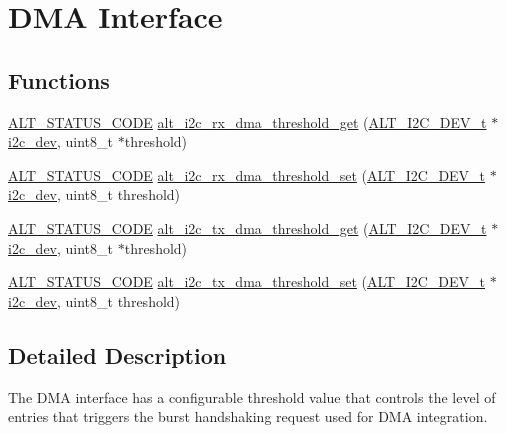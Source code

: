 \hypertarget{group__ALT__I2C__DMA}{}\section{D\+MA Interface}
\label{group__ALT__I2C__DMA}
\subsection*{Functions}
\begin{DoxyCompactItemize}
\item 
\mbox{\hyperlink{hwlib_8h_abdb0d369f069723ca55d6c94bcaaaa12}{A\+L\+T\+\_\+\+S\+T\+A\+T\+U\+S\+\_\+\+C\+O\+DE}} \mbox{\hyperlink{group__ALT__I2C__DMA_ga7424ca160282d4131f918000f7c6f6c1}{alt\+\_\+i2c\+\_\+rx\+\_\+dma\+\_\+threshold\+\_\+get}} (\mbox{\hyperlink{structALT__I2C__DEV__s}{A\+L\+T\+\_\+\+I2\+C\+\_\+\+D\+E\+V\+\_\+t}} $\ast$\mbox{\hyperlink{structi2c__dev}{i2c\+\_\+dev}}, uint8\+\_\+t $\ast$threshold)
\item 
\mbox{\hyperlink{hwlib_8h_abdb0d369f069723ca55d6c94bcaaaa12}{A\+L\+T\+\_\+\+S\+T\+A\+T\+U\+S\+\_\+\+C\+O\+DE}} \mbox{\hyperlink{group__ALT__I2C__DMA_ga556f776c29ff76200811565f5f21f212}{alt\+\_\+i2c\+\_\+rx\+\_\+dma\+\_\+threshold\+\_\+set}} (\mbox{\hyperlink{structALT__I2C__DEV__s}{A\+L\+T\+\_\+\+I2\+C\+\_\+\+D\+E\+V\+\_\+t}} $\ast$\mbox{\hyperlink{structi2c__dev}{i2c\+\_\+dev}}, uint8\+\_\+t threshold)
\item 
\mbox{\hyperlink{hwlib_8h_abdb0d369f069723ca55d6c94bcaaaa12}{A\+L\+T\+\_\+\+S\+T\+A\+T\+U\+S\+\_\+\+C\+O\+DE}} \mbox{\hyperlink{group__ALT__I2C__DMA_ga7bd9b0fc4745d569930c13ef37fbb8d4}{alt\+\_\+i2c\+\_\+tx\+\_\+dma\+\_\+threshold\+\_\+get}} (\mbox{\hyperlink{structALT__I2C__DEV__s}{A\+L\+T\+\_\+\+I2\+C\+\_\+\+D\+E\+V\+\_\+t}} $\ast$\mbox{\hyperlink{structi2c__dev}{i2c\+\_\+dev}}, uint8\+\_\+t $\ast$threshold)
\item 
\mbox{\hyperlink{hwlib_8h_abdb0d369f069723ca55d6c94bcaaaa12}{A\+L\+T\+\_\+\+S\+T\+A\+T\+U\+S\+\_\+\+C\+O\+DE}} \mbox{\hyperlink{group__ALT__I2C__DMA_ga3aaf92e0837ceb1c37af47b603985c5c}{alt\+\_\+i2c\+\_\+tx\+\_\+dma\+\_\+threshold\+\_\+set}} (\mbox{\hyperlink{structALT__I2C__DEV__s}{A\+L\+T\+\_\+\+I2\+C\+\_\+\+D\+E\+V\+\_\+t}} $\ast$\mbox{\hyperlink{structi2c__dev}{i2c\+\_\+dev}}, uint8\+\_\+t threshold)
\end{DoxyCompactItemize}


\subsection{Detailed Description}
The D\+MA interface has a configurable threshold value that controls the level of entries that triggers the burst handshaking request used for D\+MA integration.

